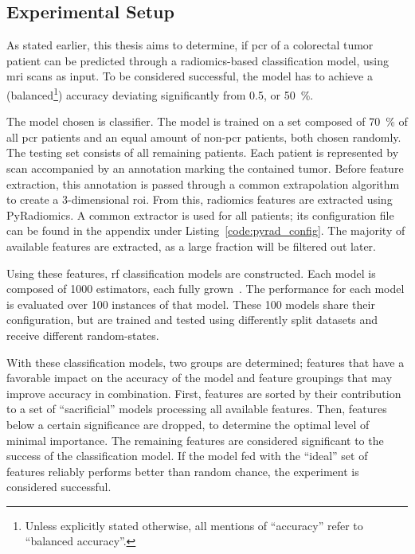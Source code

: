 \subsection{Experimental Setup}\label{sec:experimental_setup}


As stated earlier, this thesis aims to determine, if \ac{pcr} of a colorectal
tumor patient can be predicted through a radiomics-based classification model,
using \ac{mri} scans as input. To be considered successful, the model has 
to achieve a (balanced\footnote{Unless explicitly
stated otherwise, all mentions of \enquote{accuracy} refer to \enquote{balanced
accuracy}.}) accuracy deviating significantly from 0.5, or \SI{50}{\percent}. 

The model chosen is  classifier. The model is trained on a set composed
of \SI{70}{\percent} of all \ac{pcr} patients and an equal amount of non-\ac{pcr} patients,
both chosen randomly. The testing set consists of all remaining patients.
Each patient is represented by  scan accompanied by an annotation 
marking the contained tumor. Before feature extraction, this annotation is 
passed through a common extrapolation algorithm to create a 3-dimensional 
\ac{roi}. From this, radiomics features are extracted using PyRadiomics. A 
common extractor is used for all patients; its configuration file can be found
in the appendix under Listing~\ref{code:pyrad_config}. The majority of available
features are extracted, as a large fraction will be filtered out later.

Using these features, \ac{rf} classification models are constructed. Each model
is composed of 1000 estimators, each fully grown~\cite{sklearn_docs}. The 
performance for each model is evaluated over 100 instances of that model.
These 100 models share their configuration, but are trained and tested using 
differently split datasets and receive different random-states.

With these classification models, two groups are determined; features that have
a favorable impact on the accuracy of the model and feature groupings that may
improve accuracy in combination. First, features are sorted by their 
contribution to a set of \enquote{sacrificial} models processing all available features.
Then, features below a certain significance are dropped, to determine the 
optimal level of minimal importance. The remaining features are considered 
significant to the success of the classification model. If the model fed with
the \enquote{ideal} set of features reliably performs better than random chance,
the experiment is considered successful.

